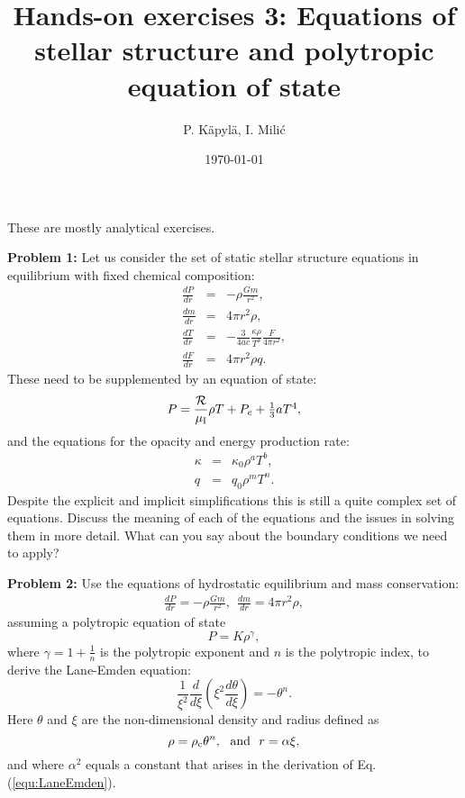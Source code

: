 \documentclass[12pt]{article}
\title{Hands-on exercises 3: Equations of stellar structure and
  polytropic equation of state}
\author{P. K\"{a}pyl\"{a}, I. Mili\'{c}}
\date{\today}
\begin{document}
\maketitle


These are mostly analytical exercises.

{\bf Problem 1:} Let us consider the set of static stellar structure
equations in equilibrium with fixed chemical composition:
\begin{eqnarray}
  \frac{dP}{dr} &=& -\rho \frac{Gm}{r^2},\\
  \frac{dm}{dr} &=& 4\pi r^2\rho, \\
  \frac{dT}{dr} &=& -\frac{3}{4ac}\frac{\kappa\rho}{T^3}\frac{F}{4\pi r^2},\\
  \frac{dF}{dr} &=& 4\pi r^2 \rho q.
\end{eqnarray}
These need to be supplemented by an equation of state:
\begin{eqnarray}
P = \frac{\cal R}{\mu_{\rm I}}\rho T + P_e + \textstyle{1\over3} a T^4,
\end{eqnarray}
and the equations for the opacity and energy production rate:
\begin{eqnarray}
  \kappa &=& \kappa_0 \rho^a T^b,\\
  q &=& q_0 \rho^m T^n.
\end{eqnarray}
Despite the explicit and implicit simplifications this is still a
quite complex set of equations. Discuss the meaning of each of the
equations and the issues in solving them in more detail. What can you
say about the boundary conditions we need to apply?


{\bf Problem 2:} Use the equations of hydrostatic equilibrium and mass
conservation:
\begin{eqnarray}
  \frac{dP}{dr} = -\rho \frac{Gm}{r^2},\ \ \frac{dm}{dr} = 4\pi r^2\rho, 
\end{eqnarray}
assuming a polytropic equation of state
\begin{equation}
P = K \rho^\gamma,
\end{equation}
where $\gamma = 1 + \frac{1}{n}$ is the polytropic exponent and $n$ is
the polytropic index, to derive the Lane-Emden equation:
\begin{equation}
\frac{1}{\xi^2} \frac{d}{d\xi} \left(\xi^2 \frac{d\theta}{d\xi} \right) = -\theta^n.\label{equ:LaneEmden}
\end{equation}
Here $\theta$ and $\xi$ are the non-dimensional density and radius
defined as
\begin{equation}
\rho = \rho_{\rm c} \theta^n, \ \ \mbox{and}\ \ r = \alpha\xi,
\end{equation}
and where $\alpha^2$ equals a constant that arises in the derivation
of Eq.(\ref{equ:LaneEmden}).
\end{document}

